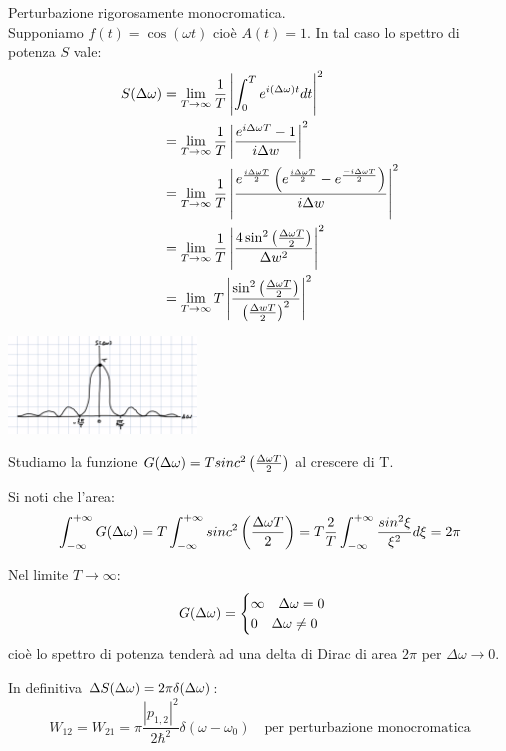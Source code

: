 \begin{example}
Perturbazione rigorosamente monocromatica.\\
Supponiamo $f(t) = \cos(\omega t)$ cioè $A(t) = 1$. In tal caso lo spettro di potenza $S$ vale:
\begin{align*}
    S(\Delta \omega) &= \lim_{T \rightarrow \infty} \frac{1}{T} \left| \int_0^T e^{i(\Delta\omega) t} dt \right|^2\\
    &= \lim_{T \rightarrow \infty} \frac{1}{T} \left|\frac{e^{i\Delta\omega T} - 1}{i\Delta w} \right|^2\\
    &= \lim_{T \rightarrow \infty} \frac{1}{T} \left|\frac{e^{\frac{i\Delta\omega T}{2}} \left(e^{\frac{i\Delta\omega T}{2}} - e^{\frac{-i\Delta\omega T}{2}} \right)}{i\Delta w} \right|^2\\
    &= \lim_{T \rightarrow \infty} \frac{1}{T} \left|\frac{4 \sin^2\left(\frac{\Delta\omega T}{2}\right)}{\Delta w^2} \right|^2\\
    &= \lim_{T \rightarrow \infty} T \left|\frac{\sin^2\left(\frac{\Delta\omega T}{2}\right)}{\left(\frac{\Delta w T}{2}\right)^2} \right|^2
\end{align*}

\includegraphics[width=5cm, center]{sinc}

Studiamo la funzione $G(\Delta \omega) = T sinc^2\left(\frac{\Delta \omega T}{2}\right)$ al crescere di T.

Si noti che l'area:
\begin{equation*}
    \int_{-\infty}^{+\infty} G(\Delta \omega) = T \int_{-\infty}^{+\infty} sinc^2\left(\frac{\Delta \omega T}{2}\right) = T \frac{2}{T} \int_{-\infty}^{+\infty} \frac{sin^2\xi}{\xi^2} d\xi = 2\pi
\end{equation*}

Nel limite $T \rightarrow \infty$:
\begin{equation*}
    G(\Delta \omega) = \begin{cases}
        \infty \quad \Delta\omega = 0\\
        0 \quad \Delta\omega \neq 0
    \end{cases}
\end{equation*}
cioè lo spettro di potenza tenderà ad una delta di Dirac di area $2\pi$ per $\Delta \omega \rightarrow 0$.

In definitiva $\Delta S(\Delta \omega) = 2\pi \delta(\Delta \omega)$:
\begin{equation*}
    W_{12} = W_{21} = \pi \frac{|p_{1,2}|^2}{2\hbar^2} \delta(\omega - \omega_0) \quad \text{per perturbazione monocromatica}
\end{equation*}
\end{example}

